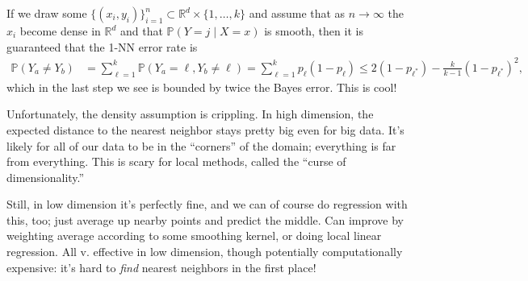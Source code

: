 \documentclass[11pt,letterpaper]{article}
\theoremstyle{definition}
\numberwithin{equation}{section}
\numberwithin{figure}{section}
\begin{document}
If we draw some $\{(x_i,y_i)\}_{i=1}^n \subset \mathbb{R}^d \times \{1,\ldots,k\}$ and assume that as $n \to \infty$ the $x_i$ become dense in $\mathbb{R}^d$ and that $\mathbb{P}(Y=j\mid X=x)$ is smooth, then it is guaranteed that the 1-NN error rate is
%
\begin{align}
	\mathbb{P}(Y_a \neq Y_b) &= \sum_{\ell=1}^k \mathbb{P}(Y_a = \ell, Y_b \neq \ell) = \sum_{\ell=1}^k p_\ell(1-p_\ell) \leq 2 (1-p_{\ell^\ast}) - \frac{k}{k-1} (1-p_{\ell^\ast})^2,
\end{align}
%
which in the last step we see is bounded by twice the Bayes error. This is cool!

Unfortunately, the density assumption is crippling. In high dimension, the expected distance to the nearest neighbor stays pretty big even for big data. It's likely for all of our data to be in the ``corners'' of the domain; everything is far from everything. This is scary for local methods, called the ``curse of dimensionality.''

Still, in low dimension it's perfectly fine, and we can of course do regression with this, too; just average up nearby points and predict the middle. Can improve by weighting average according to some smoothing kernel, or doing local linear regression. All v. effective in low dimension, though potentially computationally expensive: it's hard to \emph{find} nearest neighbors in the first place!
\end{document}
